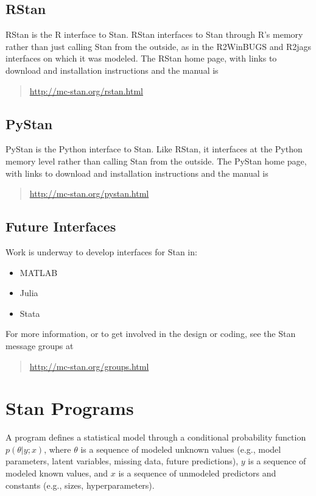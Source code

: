 \subsection{RStan}

RStan is the R interface to Stan.  RStan interfaces to Stan through
R's memory rather than just calling Stan from the outside, as in the
R2WinBUGS and R2jags interfaces on which it was modeled.  The RStan
home page, with links to download and installation instructions and the 
manual is
%
\begin{quote}
\url{http://mc-stan.org/rstan.html}
\end{quote}

\subsection{PyStan}

PyStan is the Python interface to Stan.  Like RStan, it interfaces at
the Python memory level rather than calling Stan from the outside.
The PyStan home page, with links to download and installation
instructions and the manual is
%
\begin{quote}
\url{http://mc-stan.org/pystan.html}
\end{quote}


\subsection{Future Interfaces}

Work is underway to develop interfaces for Stan in:
%
\begin{itemize}
\item MATLAB
\item Julia
\item Stata
\end{itemize}
%
For more information, or to get involved in the design or coding, see
the Stan message groups at
%
\begin{quote}
\url{http://mc-stan.org/groups.html}
\end{quote}


\section{Stan Programs}

A \Stan program defines a statistical model through a conditional
probability function $p(\theta|y;x)$, where $\theta$ is a sequence of
modeled unknown values (e.g., model parameters, latent variables, missing
data, future predictions), $y$ is a sequence of modeled known 
values, and $x$ is a sequence of unmodeled predictors and constants
(e.g., sizes, hyperparameters).

